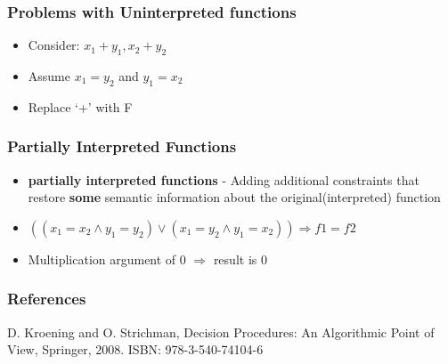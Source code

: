 \documentclass{beamer}
\begin{document}
\begin{frame}

 \frametitle{Problems with \textbf{Un}interpreted functions}
 
 \begin{itemize}
 
 \item Consider:  \ensuremath{x_1 + y_1, x_2 + y_2}
 \item Assume \ensuremath{x_1 = y_2} and \ensuremath{y_1 = x_2}
 \item Replace `+' with F
 \end{itemize}
 
\end{frame}

\begin{frame}

 \frametitle{Partially Interpreted Functions}
 
 \begin{itemize}
 
 \item \textbf{partially interpreted functions} - Adding additional constraints that restore \textbf{some} semantic information about the original(interpreted) function
 \item \ensuremath{((x_1 = x_2 \land y_1 =y_2)\lor(x_1 =y_2 \land y_1 = x_2)) \Longrightarrow f1 = f2} 
 \item Multiplication argument of 0 \ensuremath{\Longrightarrow} result is 0
 
 \end{itemize}
 
\end{frame}

\nocite{Coker::Principles-of-R,Haldar:04:Semantic-Remote,Fabrega:1999aa,Ryan:09:Introduction-to}

\begin{frame}
  \frametitle{References}
  
  D. Kroening and O. Strichman, Decision Procedures: An Algorithmic Point of View, Springer, 2008. ISBN: 978-3-540-74104-6
\end{frame}
\end{document}
